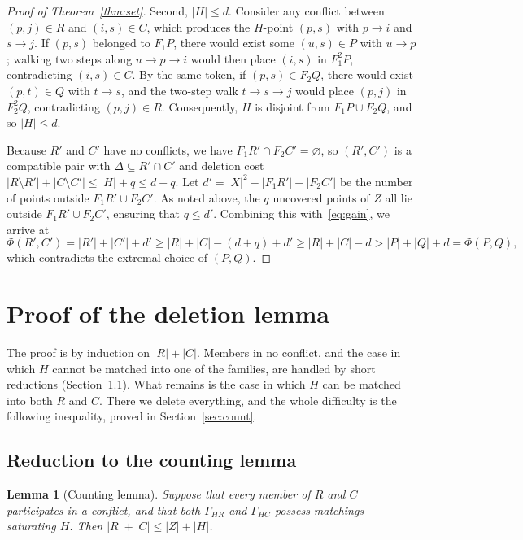 \documentclass[11pt]{amsart}
\newtheorem{lemma}[theorem]{Lemma}
\theoremstyle{remark}
\newcommand{\abs}[1]{\lvert #1\rvert}
\begin{document}
\begin{proof}[Proof of Theorem~\ref{thm:set}]
Second, $\abs H\le d$. Consider any conflict between $(p,j)\in R$ and $(i,s)\in C$, which produces the $H$-point $(p,s)$ with $p\to i$ and $s\to j$. If $(p,s)$ belonged to $F_1P$, there would exist some $(u,s)\in P$ with $u\to p$; walking two steps along $u\to p\to i$ would then place $(i,s)$ in $F_1^2P$, contradicting $(i,s)\in C$. By the same token, if $(p,s)\in F_2Q$, there would exist $(p,t)\in Q$ with $t\to s$, and the two-step walk $t\to s\to j$ would place $(p,j)$ in $F_2^2Q$, contradicting $(p,j)\in R$. Consequently, $H$ is disjoint from $F_1P\cup F_2Q$, and so $\abs H\le d$.

Because $R'$ and $C'$ have no conflicts, we have $F_1R'\cap F_2C'=\varnothing$, so $(R',C')$ is a compatible pair with $\Delta\subseteq R'\cap C'$ and deletion cost $\abs{R\setminus R'}+\abs{C\setminus C'}\le\abs H+q\le d+q$. Let $d'=\abs X^2-\abs{F_1R'}-\abs{F_2C'}$ be the number of points outside $F_1R'\cup F_2C'$. As noted above, the $q$ uncovered points of $Z$ all lie outside $F_1R'\cup F_2C'$, ensuring that $q\le d'$. Combining this with~\eqref{eq:gain}, we arrive at
\[
  \Phi(R',C')=\abs{R'}+\abs{C'}+d'\ge\abs R+\abs C-(d+q)+d'
  \ge\abs R+\abs C-d>\abs P+\abs Q+d=\Phi(P,Q),
\]
which contradicts the extremal choice of $(P,Q)$.
\end{proof}


\section{Proof of the deletion lemma}\label{sec:proof}

The proof is by induction on $\abs R+\abs C$. Members in no conflict, and the case in which $H$ cannot be matched into one of the families, are handled by short reductions (Section~\ref{sec:reduce}). What remains is the case in which $H$ can be matched into both $R$ and $C$. There we delete everything, and the whole difficulty is the following inequality, proved in Section~\ref{sec:count}.

\subsection{Reduction to the counting lemma}\label{sec:reduce}

\begin{lemma}[Counting lemma]\label{lem:count}
Suppose that every member of $R$ and $C$ participates in a conflict, and that both $\Gamma_{HR}$ and $\Gamma_{HC}$ possess matchings saturating $H$. Then $\abs R+\abs C\le\abs Z+\abs H$.
\end{lemma}
\end{document}
